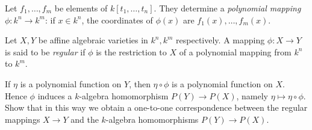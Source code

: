 \begin{exercise}
Let \(f_1, \ldots, f_m\) be elements of \(k[t_1, \ldots, t_n]\).
They determine a \emph{polynomial mapping} \(\phi : k^n \to k^m\):
if \(x \in k^n\), the coordinates of \(\phi(x)\) are \(f_1(x), \ldots, f_m(x)\).

Let \(X, Y\) be affine algebraic varieties in \(k^n, k^m\) respectively.
A mapping \(\phi : X \to Y\) is said to be \emph{regular} if \(\phi\) is the restriction to \(X\) of a polynomial mapping from \(k^n\) to \(k^m\).

If \(\eta\) is a polynomial function on \(Y\), then \(\eta \circ \phi\) is a polynomial function on \(X\).
Hence \(\phi\) induces a \(k\)-algebra homomorphism \(P(Y) \to P(X)\), namely \(\eta \mapsto \eta \circ \phi\).
Show that in this way we obtain a one-to-one correspondence between the regular mappings \(X \to Y\) and the \(k\)-algebra homomorphisms \(P(Y) \to P(X)\).
\end{exercise}